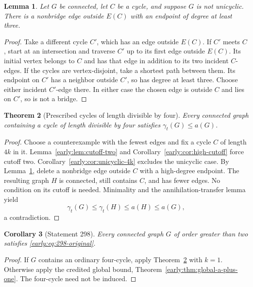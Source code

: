 \documentclass[11pt,a4paper]{article}
\newtheorem{theorem}{Theorem}[section]
\newtheorem{lemma}[theorem]{Lemma}
\newtheorem{corollary}[theorem]{Corollary}
\theoremstyle{definition}\newtheorem{definition}[theorem]{Definition}
\theoremstyle{remark}\newtheorem{remark}[theorem]{Remark}
\begin{document}
\begin{lemma}
\label{early:lem:removable-cycle-edge}
Let $G$ be connected, let $C$ be a cycle, and suppose $G$ is not
unicyclic.  There is a nonbridge edge outside $E(C)$ with an
endpoint of degree at least three.
\end{lemma}
\begin{proof}
Take a different cycle $C'$, which has an edge outside $E(C)$.
If $C'$ meets $C$, start at an intersection and traverse $C'$ up
to its first edge outside $E(C)$.  Its initial vertex belongs to
$C$ and has that edge in addition to its two incident $C$-edges.
If the cycles are vertex-disjoint, take a shortest path between
them.  Its endpoint on $C'$ has a neighbor outside $C'$, so has
degree at least three.  Choose either incident $C'$-edge there.
In either case the chosen edge is outside $C$ and lies on $C'$,
so is not a bridge.
\end{proof}

\begin{theorem}[Prescribed cycles of length divisible by four]
\label{early:thm:4k-cycle}
Every connected graph containing a cycle of length divisible by
four satisfies $\gamma_t(G)\leq a(G)$.
\end{theorem}
\begin{proof}
Choose a counterexample with the fewest edges and fix a cycle
$C$ of length $4k$ in it.  Lemma~\ref{early:lem:cutoff-two} and
Corollary~\ref{early:cor:high-cutoff} force cutoff two.
Corollary~\ref{early:cor:unicyclic-4k} excludes the unicyclic case.
By Lemma~\ref{early:lem:removable-cycle-edge}, delete a nonbridge
edge outside $C$ with a high-degree endpoint.  The resulting
graph $H$ is connected, still contains $C$, and has fewer edges.
No condition on its cutoff is needed.  Minimality and the
annihilation-transfer lemma yield
\[
 \gamma_t(G)\leq\gamma_t(H)\leq a(H)\leq a(G),
\]
a contradiction.
\end{proof}

\begin{corollary}[Statement 298]
\label{early:cor:298}
Every connected graph $G$ of order greater than two satisfies
\eqref{early:eq:298-original}.
\end{corollary}
\begin{proof}
If $G$ contains an ordinary four-cycle, apply
Theorem~\ref{early:thm:4k-cycle} with $k=1$.  Otherwise apply the
credited global bound, Theorem~\ref{early:thm:global-a-plus-one}.
The four-cycle need not be induced.
\end{proof}
\end{document}
